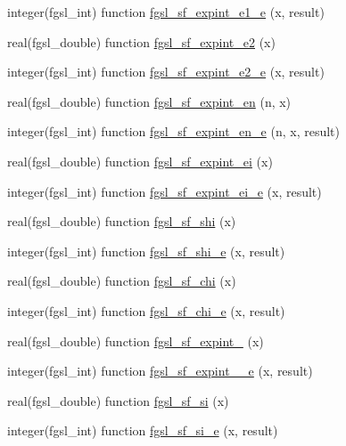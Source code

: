 \begin{DoxyCompactItemize}
\item 
integer(fgsl\+\_\+int) function \hyperlink{specfunc_8finc_a16a9e5c0464dbb48ed274a8873ebbfda}{fgsl\+\_\+sf\+\_\+expint\+\_\+e1\+\_\+e} (x, result)
\item 
real(fgsl\+\_\+double) function \hyperlink{specfunc_8finc_ab6079b2df39d2fb6a3bfd9819f6212e6}{fgsl\+\_\+sf\+\_\+expint\+\_\+e2} (x)
\item 
integer(fgsl\+\_\+int) function \hyperlink{specfunc_8finc_a3e069fda991712e2b6351aaa26c2189a}{fgsl\+\_\+sf\+\_\+expint\+\_\+e2\+\_\+e} (x, result)
\item 
real(fgsl\+\_\+double) function \hyperlink{specfunc_8finc_a16ce71837e8b52a820deb3fab6b66a60}{fgsl\+\_\+sf\+\_\+expint\+\_\+en} (n, x)
\item 
integer(fgsl\+\_\+int) function \hyperlink{specfunc_8finc_af8874814e990349a2b3264aad080fded}{fgsl\+\_\+sf\+\_\+expint\+\_\+en\+\_\+e} (n, x, result)
\item 
real(fgsl\+\_\+double) function \hyperlink{specfunc_8finc_a048398b35a68cecd603f6eb9b631f2f9}{fgsl\+\_\+sf\+\_\+expint\+\_\+ei} (x)
\item 
integer(fgsl\+\_\+int) function \hyperlink{specfunc_8finc_af532efbc43623c9a9f75c9aef2ad2636}{fgsl\+\_\+sf\+\_\+expint\+\_\+ei\+\_\+e} (x, result)
\item 
real(fgsl\+\_\+double) function \hyperlink{specfunc_8finc_adb58b4b179f3b35d19743293daa4b686}{fgsl\+\_\+sf\+\_\+shi} (x)
\item 
integer(fgsl\+\_\+int) function \hyperlink{specfunc_8finc_ac5a4218a89f523d20b305b0dc1e1ca1b}{fgsl\+\_\+sf\+\_\+shi\+\_\+e} (x, result)
\item 
real(fgsl\+\_\+double) function \hyperlink{specfunc_8finc_ae7e5c37b2434e580f641b0e53fe96371}{fgsl\+\_\+sf\+\_\+chi} (x)
\item 
integer(fgsl\+\_\+int) function \hyperlink{specfunc_8finc_aedcf2efcc9e986772e6bdcc007ffc27a}{fgsl\+\_\+sf\+\_\+chi\+\_\+e} (x, result)
\item 
real(fgsl\+\_\+double) function \hyperlink{specfunc_8finc_a958f500a44e09d559fadac3339ce9519}{fgsl\+\_\+sf\+\_\+expint\+\_} (x)
\item 
integer(fgsl\+\_\+int) function \hyperlink{specfunc_8finc_a325507af4aa0896b4423cf73b8a5a34e}{fgsl\+\_\+sf\+\_\+expint\+\_\+\_\+e} (x, result)
\item 
real(fgsl\+\_\+double) function \hyperlink{specfunc_8finc_aa859f421d91e31ea36a969ef6d360669}{fgsl\+\_\+sf\+\_\+si} (x)
\item 
integer(fgsl\+\_\+int) function \hyperlink{specfunc_8finc_aad8bb79beecb4c68e0c47f16dae52eba}{fgsl\+\_\+sf\+\_\+si\+\_\+e} (x, result)

\end{DoxyCompactItemize}
